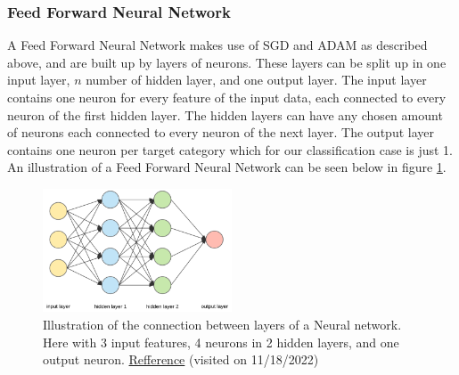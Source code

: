 \documentclass[11pt]{article}
\begin{document}
\subsubsection*{Feed Forward Neural Network}
A Feed Forward Neural Network makes use of SGD and ADAM as described above, and are built up by layers of neurons. These layers can be split up in one input layer, $n$ number of hidden layer, and one output layer. The input layer contains one neuron for every feature of the input data, each connected to every neuron of the first hidden layer. The hidden layers can have any chosen amount of neurons each connected to every neuron of the next layer. The output layer contains one neuron per target category which for our classification case is just 1. An illustration of a Feed Forward Neural Network can be seen below in figure \ref{fig:NN_layers}.
\begin{figure}[H]
    \centering
    \includegraphics[width=0.5\textwidth]{../figures/NN_layers.png}
    \caption{Illustration of the connection between layers of a Neural network. Here with 3 input features, 4 neurons in 2 hidden layers, and one output neuron. \href{https://towardsdatascience.com/applied-deep-learning-part-1-artificial-neural-networks-d7834f67a4f6}{Refference}
        (visited on 11/18/2022)}
    \label{fig:NN_layers}
\end{figure}
\end{document}
